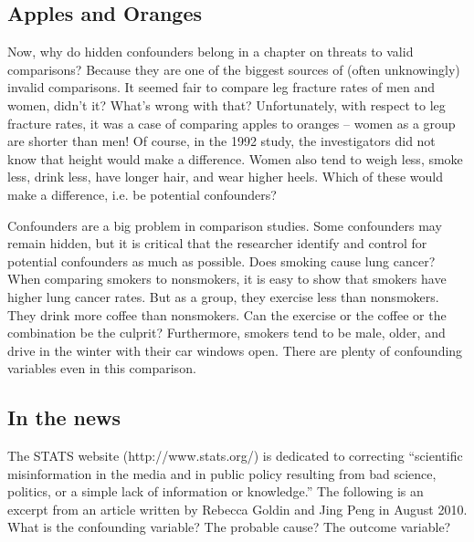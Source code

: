 \documentclass[11pt, chapterprefix=true]{scrbook}\usepackage[]{graphicx}\usepackage[]{color}
\begin{document}
\subsection{Apples and Oranges}

Now, why do hidden confounders belong in a chapter on threats to valid comparisons? Because they are one of the biggest sources of (often unknowingly) invalid comparisons.  It seemed fair to compare leg fracture rates of men and women, didn't it?  What's wrong with that?  Unfortunately, with respect to leg fracture rates, it was a case of comparing apples to oranges -- women as a group are shorter than men!  Of course, in the 1992 study, the investigators did not know that height would make a difference.  Women also tend to weigh less, smoke less, drink less, have longer hair, and wear higher heels.  Which of these would make a difference, i.e. be potential confounders?

Confounders are a big problem in comparison studies.  Some confounders may remain hidden, but it is critical that the researcher identify and control for potential confounders as much as possible.  Does smoking cause lung cancer?  When comparing smokers to nonsmokers, it is easy to show that smokers have higher lung cancer rates.  But as a group, they exercise less than nonsmokers.  They drink more coffee than nonsmokers.  Can the exercise or the coffee or the combination be the culprit?  Furthermore, smokers tend to be male, older, and drive in the winter with their car windows open.  There are plenty of confounding variables even in this comparison.

\subsection{In the news}

The STATS website (http://www.stats.org/) is dedicated to correcting ``scientific
misinformation in the media and in public policy resulting from bad science,
politics, or a simple lack of information or knowledge.''  The following is an excerpt from an article written by Rebecca Goldin and Jing Peng in August 2010.  What is the confounding variable?  The probable cause? The outcome variable?
\end{document}
